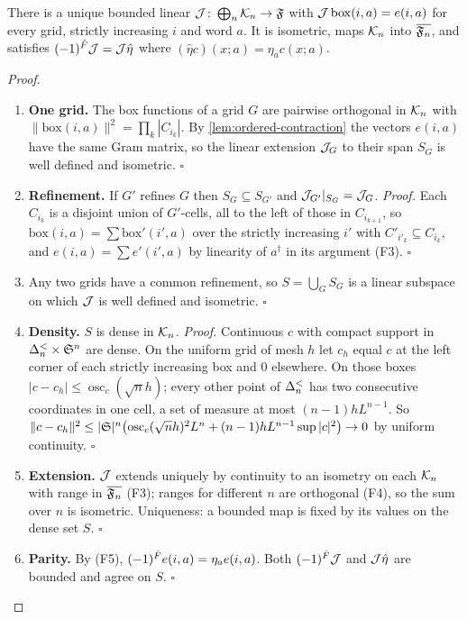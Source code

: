 \begin{lemma}
\label{lem:cmps-fock-isometry}
There is a unique bounded linear $\mathcal J\colon\bigoplus_n\mathcal K_{n}\to\mathfrak F$ with
$\mathcal J\,\mathrm{box}(i,a)=e(i,a)$ for every grid, strictly increasing $i$ and word $a$. It is
isometric, maps $\mathcal K_{n}$ into $\overline{\mathfrak F_n}$, and satisfies $(-1)^{\hat F}\mathcal J=\mathcal J\hat\eta$
where $(\hat\eta c)(x;a)=\eta_a c(x;a)$.
\end{lemma}

\begin{proof}
\begin{enumerate}
\item[$\langle1\rangle$1.] \textbf{One grid.} The box functions of a grid $G$ are pairwise
orthogonal in $\mathcal K_{n}$ with $\|\mathrm{box}(i,a)\|^2=\prod_k|C_{i_k}|$. By
\cref{lem:ordered-contraction} the vectors $e(i,a)$ have the same Gram matrix, so the linear
extension $\mathcal J_G$ to their span $S_G$ is well defined and isometric. $\square$
\item[$\langle1\rangle$2.] \textbf{Refinement.} If $G'$ refines $G$ then $S_G\subseteq S_{G'}$ and
$\mathcal J_{G'}|_{S_G}=\mathcal J_G$. \emph{Proof.} Each $C_{i_k}$ is a disjoint union of $G'$-cells,
all to the left of those in $C_{i_{k+1}}$, so $\mathrm{box}(i,a)=\sum\mathrm{box}'(i',a)$
over the strictly increasing $i'$ with $C'_{i'_k}\subseteq C_{i_k}$, and $e(i,a)=\sum e'(i',a)$
by linearity of $a^\dagger$ in its argument (F3). $\square$
\item[$\langle1\rangle$3.] Any two grids have a common refinement, so $S=\bigcup_GS_G$ is a
linear subspace on which $\mathcal J$ is well defined and isometric. $\square$
\item[$\langle1\rangle$4.] \textbf{Density.} $S$ is dense in $\mathcal K_{n}$. \emph{Proof.}
Continuous $c$ with compact support in $\Delta^{<}_{n}\times\mathfrak S^n$ are dense. On the uniform grid
of mesh $h$ let $c_h$ equal $c$ at the left corner of each strictly increasing box and $0$
elsewhere. On those boxes $|c-c_h|\le\operatorname{osc}_c(\sqrt nh)$; every other point of
$\Delta^{<}_{n}$ has two consecutive coordinates in one cell, a set of measure at most
$(n-1)hL^{n-1}$. So $\|c-c_h\|^2\le|\mathfrak S|^n\bigl(\operatorname{osc}_c(\sqrt nh)^2L^n+(n-1)hL^{n-1}
\sup|c|^2\bigr)\to0$ by uniform continuity. $\square$
\item[$\langle1\rangle$5.] \textbf{Extension.} $\mathcal J$ extends uniquely by continuity to an
isometry on each $\mathcal K_{n}$ with range in $\overline{\mathfrak F_n}$ (F3); ranges for different $n$
are orthogonal (F4), so the sum over $n$ is isometric. Uniqueness: a bounded map is fixed by
its values on the dense set $S$. $\square$
\item[$\langle1\rangle$6.] \textbf{Parity.} By (F5), $(-1)^{\hat F} e(i,a)=\eta_ae(i,a)$. Both
$(-1)^{\hat F}\mathcal J$ and $\mathcal J\hat\eta$ are bounded and agree on $S$. $\square$
\end{enumerate}
\end{proof}

